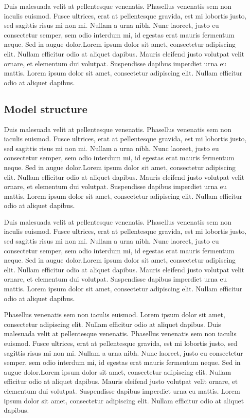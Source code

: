 \documentclass[12pt]{article}
\begin{document}
Duis malesuada velit at pellentesque venenatis. Phasellus venenatis sem non iaculis euismod. Fusce ultrices, erat at pellentesque gravida, est mi lobortis justo, sed sagittis risus mi non mi. Nullam a urna nibh. Nunc laoreet, justo eu consectetur semper, sem odio interdum mi, id egestas erat mauris fermentum neque. Sed in augue dolor.Lorem ipsum dolor sit amet, consectetur adipiscing elit. Nullam efficitur odio at aliquet dapibus. Mauris eleifend justo volutpat velit ornare, et elementum dui volutpat. Suspendisse dapibus imperdiet urna eu mattis. Lorem ipsum dolor sit amet, consectetur adipiscing elit. Nullam efficitur odio at aliquet dapibus.

\subsection{Model structure}
Duis malesuada velit at pellentesque venenatis. Phasellus venenatis sem non iaculis euismod. Fusce ultrices, erat at pellentesque gravida, est mi lobortis justo, sed sagittis risus mi non mi. Nullam a urna nibh. Nunc laoreet, justo eu consectetur semper, sem odio interdum mi, id egestas erat mauris fermentum neque. Sed in augue dolor.Lorem ipsum dolor sit amet, consectetur adipiscing elit. Nullam efficitur odio at aliquet dapibus. Mauris eleifend justo volutpat velit ornare, et elementum dui volutpat. Suspendisse dapibus imperdiet urna eu mattis. Lorem ipsum dolor sit amet, consectetur adipiscing elit. Nullam efficitur odio at aliquet dapibus.

Duis malesuada velit at pellentesque venenatis. Phasellus venenatis sem non iaculis euismod. Fusce ultrices, erat at pellentesque gravida, est mi lobortis justo, sed sagittis risus mi non mi. Nullam a urna nibh. Nunc laoreet, justo eu consectetur semper, sem odio interdum mi, id egestas erat mauris fermentum neque. Sed in augue dolor.Lorem ipsum dolor sit amet, consectetur adipiscing elit. Nullam efficitur odio at aliquet dapibus. Mauris eleifend justo volutpat velit ornare, et elementum dui volutpat. Suspendisse dapibus imperdiet urna eu mattis. Lorem ipsum dolor sit amet, consectetur adipiscing elit. Nullam efficitur odio at aliquet dapibus.

Phasellus venenatis sem non iaculis euismod. Lorem ipsum dolor sit amet, consectetur adipiscing elit. Nullam efficitur odio at aliquet dapibus. Duis malesuada velit at pellentesque venenatis. Phasellus venenatis sem non iaculis euismod. Fusce ultrices, erat at pellentesque gravida, est mi lobortis justo, sed sagittis risus mi non mi. Nullam a urna nibh. Nunc laoreet, justo eu consectetur semper, sem odio interdum mi, id egestas erat mauris fermentum neque. Sed in augue dolor.Lorem ipsum dolor sit amet, consectetur adipiscing elit. Nullam efficitur odio at aliquet dapibus. Mauris eleifend justo volutpat velit ornare, et elementum dui volutpat. Suspendisse dapibus imperdiet urna eu mattis. Lorem ipsum dolor sit amet, consectetur adipiscing elit. Nullam efficitur odio at aliquet dapibus.
\end{document}
